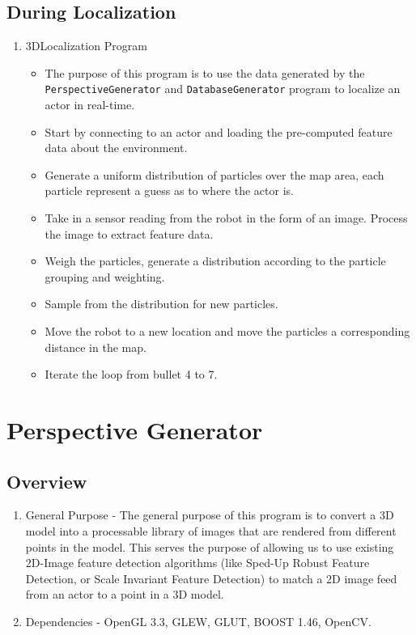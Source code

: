 \documentclass[a4paper,11pt]{article}
\begin{document}
        \subsection{During Localization}
        \begin{enumerate}
        \item 3DLocalization Program
            \begin{itemize}
            \item The purpose of this program is to use the data generated by the \texttt{PerspectiveGenerator} and \texttt{DatabaseGenerator} program to localize
            an actor in real-time. 
            \item Start by connecting to an actor and loading the pre-computed feature data about the environment.
            \item Generate a uniform distribution of particles over the map area, each particle represent a guess as to where the actor is.
            \item Take in a sensor reading from the robot in the form of an image. Process the image to extract feature data.
            \item Weigh the particles, generate a distribution according to the particle grouping and weighting.
            \item Sample from the distribution for new particles.
            \item Move the robot to a new location and move the particles a corresponding distance in the map.
            \item Iterate the loop from bullet 4 to 7.
            \end{itemize}
        \end{enumerate}
        \newpage

        
        
        
    \section{Perspective Generator}

        \subsection{Overview}
        \begin{enumerate}
        \item General Purpose - The general purpose of this program is to convert a 3D model into a processable library of images that are rendered from 
        different points in the model. This serves the purpose of allowing us to use existing 2D-Image feature detection algorithms 
        (like Sped-Up Robust Feature Detection, or Scale Invariant Feature Detection) to match a 2D image feed from an actor to a point in a 3D model.
        \item Dependencies - OpenGL 3.3, GLEW, GLUT, BOOST 1.46, OpenCV.
        \end{enumerate}
        
\end{document}
